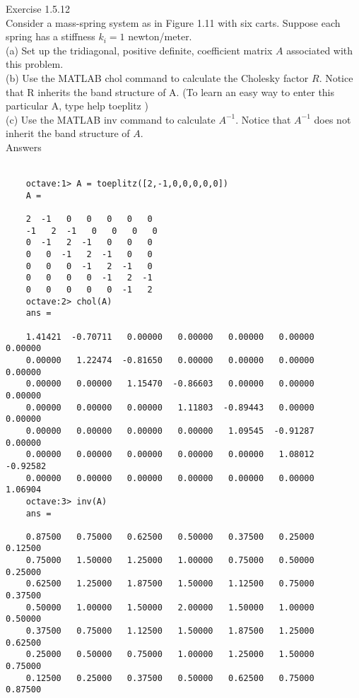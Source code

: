 \documentclass{article}
\begin{document}
	Exercise 1.5.12\\
	Consider a mass-spring system as in Figure 1.11 with six carts. Suppose each spring has a stiffness $k_i = 1$ newton/meter.\\ 
	(a) Set up the tridiagonal, positive definite, coefficient matrix $A$ associated with this problem.\\ 
	(b) Use the MATLAB chol command to calculate the Cholesky factor $R$. Notice that R inherits the band structure of A. (To learn an easy way to enter this particular A, type help toeplitz )\\ 
	(c) Use the MATLAB inv command to calculate $A^{-1}$. Notice that $A^{-1}$ does not inherit the band structure of $A$.
	\\
	Answers\\
	\\
	\begin{verbatim}
	octave:1> A = toeplitz([2,-1,0,0,0,0,0])
	A =
		
	2  -1   0   0   0   0   0
	-1   2  -1   0   0   0   0
	0  -1   2  -1   0   0   0
	0   0  -1   2  -1   0   0
	0   0   0  -1   2  -1   0
	0   0   0   0  -1   2  -1
	0   0   0   0   0  -1   2
	octave:2> chol(A)
	ans =
	
	1.41421  -0.70711   0.00000   0.00000   0.00000   0.00000   0.00000
	0.00000   1.22474  -0.81650   0.00000   0.00000   0.00000   0.00000
	0.00000   0.00000   1.15470  -0.86603   0.00000   0.00000   0.00000
	0.00000   0.00000   0.00000   1.11803  -0.89443   0.00000   0.00000
	0.00000   0.00000   0.00000   0.00000   1.09545  -0.91287   0.00000
	0.00000   0.00000   0.00000   0.00000   0.00000   1.08012  -0.92582
	0.00000   0.00000   0.00000   0.00000   0.00000   0.00000   1.06904
	octave:3> inv(A)
	ans =
	
	0.87500   0.75000   0.62500   0.50000   0.37500   0.25000   0.12500
	0.75000   1.50000   1.25000   1.00000   0.75000   0.50000   0.25000
	0.62500   1.25000   1.87500   1.50000   1.12500   0.75000   0.37500
	0.50000   1.00000   1.50000   2.00000   1.50000   1.00000   0.50000
	0.37500   0.75000   1.12500   1.50000   1.87500   1.25000   0.62500
	0.25000   0.50000   0.75000   1.00000   1.25000   1.50000   0.75000
	0.12500   0.25000   0.37500   0.50000   0.62500   0.75000   0.87500
	\end{verbatim}	
\end{document}
